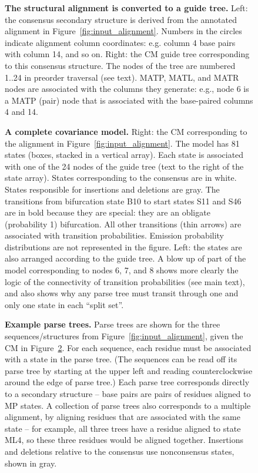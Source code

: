 \documentclass[11pt]{article}
\begin{document}
\begin{figure}[h]
\caption{\textbf{The structural alignment is converted to a guide
tree.} Left: the consensus secondary structure is derived from the
annotated alignment in Figure~\ref{fig:input_alignment}. Numbers in
the circles indicate alignment column coordinates: e.g.  column 4 base
pairs with column 14, and so on. Right: the CM guide tree
corresponding to this consensus structure. The nodes of the tree are
numbered 1..24 in preorder traversal (see text). MATP, MATL, and MATR
nodes are associated with the columns they generate: e.g., node 6 is a
MATP (pair) node that is associated with the base-paired columns 4 and
14.}
\label{fig:cm_nodetree}
\end{figure}

\begin{figure}[h]
\caption{\textbf{A complete covariance model.} Right: the CM
corresponding to the alignment in Figure~\ref{fig:input_alignment}.
The model has 81 states (boxes, stacked in a vertical array). Each
state is associated with one of the 24 nodes of the guide tree (text
to the right of the state array). States corresponding to the
consensus are in white. States responsible for insertions and
deletions are gray. The transitions from bifurcation state B10 to
start states S11 and S46 are in bold because they are special: they
are an obligate (probability 1) bifurcation. All other transitions
(thin arrows) are associated with transition probabilities.  Emission
probability distributions are not represented in the figure. Left: the
states are also arranged according to the guide tree. A blow up of
part of the model corresponding to nodes 6, 7, and 8 shows
more clearly the logic of the connectivity of transition probabilities
(see main text), and also shows why any parse tree must transit through
one and only one state in each ``split set''.}
\label{fig:cm_graph}
\end{figure}

\begin{figure}[h]
\caption{\textbf{Example parse trees.} Parse trees are shown for the
three sequences/structures from Figure~\ref{fig:input_alignment},
given the CM in Figure~\ref{fig:cm_graph}. For each sequence, each
residue must be associated with a state in the parse tree. (The
sequences can be read off its parse tree by starting at the upper left
and reading counterclockwise around the edge of parse tree.) Each
parse tree corresponds directly to a secondary structure -- base pairs
are pairs of residues aligned to MP states. A collection of parse
trees also corresponds to a multiple alignment, by aligning residues
that are associated with the same state -- for example, all three
trees have a residue aligned to state ML4, so these three residues
would be aligned together. Insertions and deletions relative to the
consensus use nonconsensus states, shown in gray.}
\label{fig:parsetrees}
\end{figure}
\end{document}
